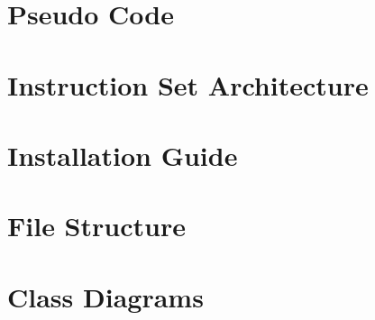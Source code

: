 \documentclass[a4paper,10pt,twoside]{report}
\begin{document}


%



\begin{appendices}
\chapter{Pseudo Code}\label{appendix:pseudo_code}

\chapter{Instruction Set Architecture}\label{appendix:isa}

\chapter{Installation Guide}\label{appendix:C}

\chapter{File Structure}\label{appendix:D}

\chapter{Class Diagrams}\label{appendix:E}

\end{appendices}

\end{document}
